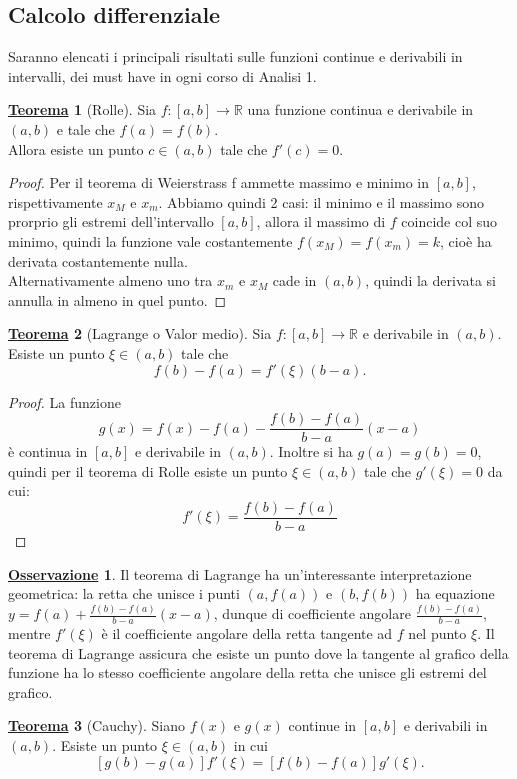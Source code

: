 \documentclass[a4paper,twoside]{article}
\newcommand{\R}{\mathbb{R}}
\theoremstyle{definition}
\newtheorem{theorem}{\color{Red}\underline{\textrm Teorema}}
\newtheorem{oss}{\underline{\textrm Osservazione}}
\numberwithin{theorem}{section}
\begin{document}
\subsection{Calcolo differenziale}
Saranno elencati i principali risultati sulle funzioni continue e derivabili in intervalli, dei must have in ogni corso di Analisi 1.
\begin{theorem}[Rolle]
Sia $f:[a,b]\to\R$ una funzione continua e derivabile in $(a,b)$ e tale che $f(a)=f(b)$.\\ Allora esiste un punto $c\in(a,b)$ tale che $f'(c)=0$.   
\end{theorem}
\begin{proof}
    Per il teorema di Weierstrass f ammette massimo e minimo in $[a,b]$, rispettivamente $x_M$ e $x_m$. Abbiamo quindi 2 casi:
    il minimo e il massimo sono prorprio gli estremi dell'intervallo $[a,b]$, allora il massimo di $f$ coincide col suo minimo, quindi la funzione vale costantemente $f(x_M)=f(x_m)=k$, cioè ha derivata costantemente nulla. \\
    Alternativamente almeno uno tra $x_m$ e $x_M$ cade in $(a,b)$, quindi la derivata si annulla in almeno in quel punto.
\end{proof}
\begin{theorem}[Lagrange o Valor medio]
Sia $f:[a,b]\to\R$ e derivabile in $(a,b)$. Esiste un punto $\xi\in(a,b)$ tale che $$f(b)-f(a)=f'(\xi)(b-a).$$
\end{theorem}
\begin{proof}
    La funzione $$g(x)=f(x)-f(a)-\frac{f(b)-f(a)}{b-a}(x-a)$$ è continua in $[a,b]$ e derivabile in $(a,b)$. Inoltre si ha $g(a)=g(b)=0$, quindi per il teorema di Rolle esiste un punto $\xi\in(a,b)$ tale che $g'(\xi)=0$ da cui: $$f'(\xi)=\frac{f(b)-f(a)}{b-a}$$
\end{proof}
\begin{oss}
    Il teorema di Lagrange ha un'interessante interpretazione geometrica: la retta che unisce i punti $(a,f(a))$ e $(b,f(b))$ ha equazione $y=f(a)+\frac{f(b)-f(a)}{b-a}(x-a)$, dunque di coefficiente angolare $\frac{f(b)-f(a)}{b-a}$, mentre $f'(\xi)$ è il coefficiente angolare della retta tangente ad $f$ nel punto $\xi$. Il teorema di Lagrange assicura che esiste un punto dove la tangente al grafico della funzione ha lo stesso coefficiente angolare della retta che unisce gli estremi del grafico.
\end{oss}
\begin{theorem}[Cauchy]
    Siano $f(x)$ e $g(x)$ continue in $[a,b]$ e derivabili in $(a,b)$. Esiste un punto $\xi\in(a,b)$ in cui
    $$[g(b)-g(a)]f'(\xi)=[f(b)-f(a)]g'(\xi).$$
\end{theorem}
\end{document}
